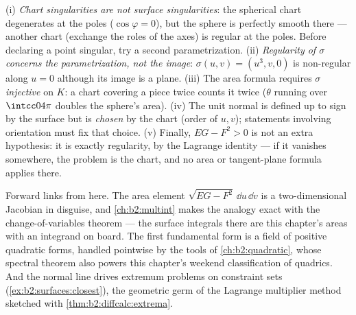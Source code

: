\begin{remark}
(i) \emph{Chart singularities are not surface singularities}:
the spherical chart degenerates at the poles
($\cos\varphi = 0$), but the sphere is perfectly smooth there
--- another chart (exchange the roles of the axes) is regular
at the poles. Before declaring a point singular, try a second
parametrization. (ii) \emph{Regularity of $\sigma$ concerns
the parametrization, not the image}: $\sigma(u, v) = (u^3, v,
0)$ is non-regular along $u = 0$ although its image is a
plane. (iii) The area formula requires $\sigma$
\emph{injective} on $K$: a chart covering a piece twice
counts it twice ($\theta$ running over $\intcc0{4\pi}$
doubles the sphere's area). (iv) The unit normal is defined
up to sign by the surface but is \emph{chosen} by the chart
(order of $u, v$); statements involving orientation must fix
that choice. (v) Finally, $EG - F^2 > 0$ is not an extra
hypothesis: it is exactly regularity, by the Lagrange
identity --- if it vanishes somewhere, the problem is the
chart, and no area or tangent-plane formula applies there.
\end{remark}

\begin{remark}
Forward links from here. The area element $\sqrt{EG -
F^2}\,\dd u\,\dd v$ is a two-dimensional Jacobian in
disguise, and \cref{ch:b2:multint} makes the analogy exact
with the change-of-variables theorem --- the surface
integrals there are this chapter's areas with an integrand on
board. The first fundamental form is a field of positive
quadratic forms, handled pointwise by the tools of
\cref{ch:b2:quadratic}, whose spectral theorem also powers
this chapter's weekend classification of quadrics. And the
normal line drives extremum problems on constraint sets
(\cref{ex:b2:surfaces:closest}), the geometric germ of the
Lagrange multiplier method sketched with
\cref{thm:b2:diffcalc:extrema}.
\end{remark}

